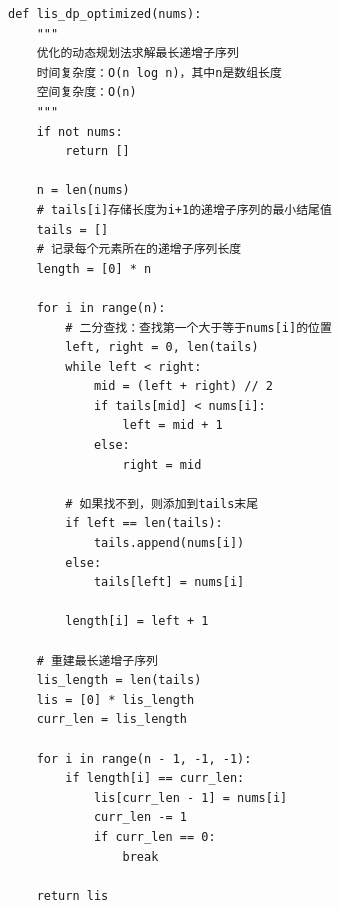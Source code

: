 \documentclass[12pt,twoside]{article}
\begin{document}
\begin{problems}
\begin{verbatim}
def lis_dp_optimized(nums):
    """
    优化的动态规划法求解最长递增子序列
    时间复杂度：O(n log n)，其中n是数组长度
    空间复杂度：O(n)
    """
    if not nums:
        return []
    
    n = len(nums)
    # tails[i]存储长度为i+1的递增子序列的最小结尾值
    tails = []
    # 记录每个元素所在的递增子序列长度
    length = [0] * n
    
    for i in range(n):
        # 二分查找：查找第一个大于等于nums[i]的位置
        left, right = 0, len(tails)
        while left < right:
            mid = (left + right) // 2
            if tails[mid] < nums[i]:
                left = mid + 1
            else:
                right = mid
                
        # 如果找不到，则添加到tails末尾
        if left == len(tails):
            tails.append(nums[i])
        else:
            tails[left] = nums[i]
            
        length[i] = left + 1
    
    # 重建最长递增子序列
    lis_length = len(tails)
    lis = [0] * lis_length
    curr_len = lis_length
    
    for i in range(n - 1, -1, -1):
        if length[i] == curr_len:
            lis[curr_len - 1] = nums[i]
            curr_len -= 1
            if curr_len == 0:
                break
    
    return lis
\end{verbatim}

\eparts

\end{problems}
\end{document}
